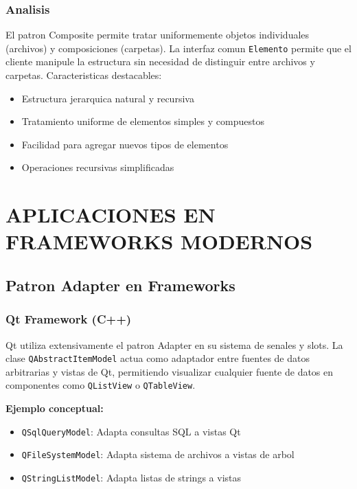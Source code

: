 \documentclass[11pt,a4paper]{article}
\begin{document}
\subsubsection{Analisis}

El patron Composite permite tratar uniformemente objetos individuales (archivos) y composiciones (carpetas). La interfaz comun \texttt{Elemento} permite que el cliente manipule la estructura sin necesidad de distinguir entre archivos y carpetas. Caracteristicas destacables:

\begin{itemize}
    \item Estructura jerarquica natural y recursiva
    \item Tratamiento uniforme de elementos simples y compuestos
    \item Facilidad para agregar nuevos tipos de elementos
    \item Operaciones recursivas simplificadas
\end{itemize}

\section{APLICACIONES EN FRAMEWORKS MODERNOS}

\subsection{Patron Adapter en Frameworks}

\subsubsection{Qt Framework (C++)}

Qt utiliza extensivamente el patron Adapter en su sistema de senales y slots. La clase \texttt{QAbstractItemModel} actua como adaptador entre fuentes de datos arbitrarias y vistas de Qt, permitiendo visualizar cualquier fuente de datos en componentes como \texttt{QListView} o \texttt{QTableView}.

\textbf{Ejemplo conceptual:}
\begin{itemize}
    \item \texttt{QSqlQueryModel}: Adapta consultas SQL a vistas Qt
    \item \texttt{QFileSystemModel}: Adapta sistema de archivos a vistas de arbol
    \item \texttt{QStringListModel}: Adapta listas de strings a vistas
\end{itemize}
\end{document}
